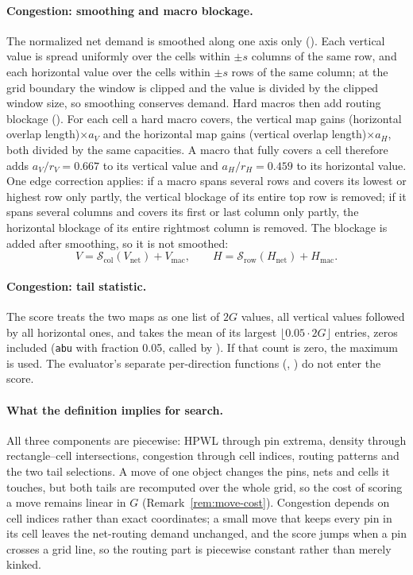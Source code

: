 \paragraph{Congestion: smoothing and macro blockage.} The normalized net demand is
smoothed along one axis only (). Each vertical
value is spread uniformly over the cells within $\pm s$ columns of the same row, and
each horizontal value over the cells within $\pm s$ rows of the same column; at the
grid boundary the window is clipped and the value is divided by the clipped window
size, so smoothing conserves demand. Hard macros then add routing blockage
(). For each cell a hard macro covers,
the vertical map gains (horizontal overlap length)$\times a_V$ and the horizontal
map gains (vertical overlap length)$\times a_H$, both divided by the same capacities.
A macro that fully covers a cell therefore adds $a_V/r_V=0.667$ to its vertical
value and $a_H/r_H=0.459$ to its horizontal value. One edge correction applies: if a
macro spans several rows and covers its lowest or highest row only partly, the
vertical blockage of its entire top row is removed; if it spans several columns and
covers its first or last column only partly, the horizontal blockage of its entire
rightmost column is removed. The blockage is added after smoothing, so it is not
smoothed:
\begin{equation}
  V=\mathcal S_{\mathrm{col}}(V_{\mathrm{net}})+V_{\mathrm{mac}},\qquad
  H=\mathcal S_{\mathrm{row}}(H_{\mathrm{net}})+H_{\mathrm{mac}}.
\end{equation}

\paragraph{Congestion: tail statistic.} The score treats the two maps as one list of
$2G$ values, all vertical values followed by all horizontal ones, and takes the mean of
its largest $\lfloor0.05\cdot2G\rfloor$ entries, zeros included (\texttt{abu} with fraction
0.05, called by ). If that count is zero, the maximum
is used. The evaluator's separate per-direction functions
(, ) do not enter
the score.

\paragraph{What the definition implies for search.} All three components are
piecewise: HPWL through pin extrema, density through rectangle--cell
intersections, congestion through cell indices, routing patterns and the two tail
selections. A move of one object changes the pins, nets and cells it touches, but
both tails are recomputed over the whole grid, so the cost of scoring a move remains
linear in $G$ (Remark~\ref{rem:move-cost}). Congestion depends on cell indices
rather than exact coordinates; a small move that keeps every pin in its cell leaves
the net-routing demand unchanged, and the score jumps when a pin crosses a grid line,
so the routing part is piecewise constant rather than merely kinked.


